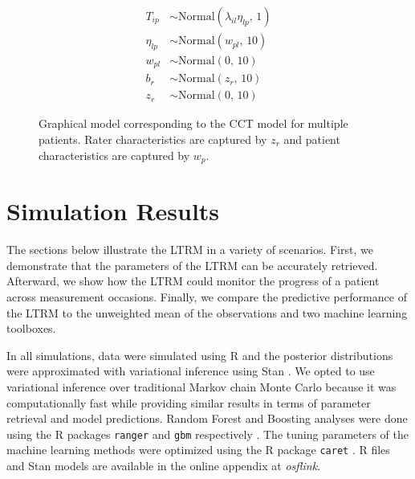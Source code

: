 \documentclass{article}
\newcommand{\DON}[1] {\todo[inline, color=white]{Don: {#1}}}
\newcommand{\Irater}{r}
\newcommand{\Iitem}{i}
\newcommand{\Ipatient}{p}
\newcommand{\Incat}{c}
\newcommand{\Ilatent}{l}
\newcommand{\Tncat}{\expandafter\MakeUppercase\expandafter{\Incat}}
\newcommand{\logit}[1]{\text{logit}\left(#1\right)}
\newcommand{\dnorm}[2]{\text{Normal}\left(#1,\,#2\right)}
\newcommand{\code}[1]{\texttt{#1}}
\newcommand{\osflink}{\textit{osflink}}
\begin{document}
\begin{figure}[!ht]
\begin{minipage}{0.5\textwidth}
{\begin{align*}
	T_{\Iitem\Ipatient} &\sim \dnorm{\lambda_{\Iitem\Ilatent}\eta_{\Ilatent\Ipatient}}{1}\\
	\eta_{\Ilatent\Ipatient} &\sim \dnorm{w_{\Ipatient\Ilatent}}{10} \\
	w_{\Ipatient\Ilatent} & \sim\dnorm{0}{10} \\
	b_\Irater   &\sim \dnorm{z_\Irater}{10}\\
	z_\Irater &\sim \dnorm{0}{10}
	\end{align*}
}%
\end{minipage}
	\caption{Graphical model corresponding to the CCT model for multiple patients. Rater characteristics are captured by $z_\Irater$ and patient characteristics are captured by $w_\Ipatient$.}
	\label{model:LTRM3}
\end{figure}

\section*{Simulation Results}

The sections below illustrate the LTRM in a variety of scenarios. First, we demonstrate that the parameters of the LTRM can be accurately retrieved. Afterward, we show how the LTRM could monitor the progress of a patient across measurement occasions. Finally, we compare the predictive performance of the LTRM to the unweighted mean of the observations and two machine learning toolboxes.

In all simulations, data were simulated using R \cite{R} and the posterior distributions were approximated with variational inference using Stan \cite{CarpenterEtAl2017Stan}. We opted to use variational inference over traditional Markov chain Monte Carlo because it was computationally fast while providing similar results in terms of parameter retrieval and model predictions. Random Forest and Boosting analyses were done using the R packages \code{ranger} and \code{gbm} respectively \cite{ranger2017, gbmPackage}. The tuning parameters of the machine learning methods were optimized using the R package \code{caret} \cite{kuhn2008building}. R files and Stan models are available in the online appendix at \osflink{}.
\end{document}
